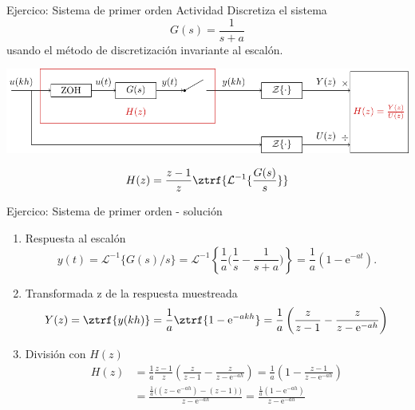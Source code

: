 \documentclass[presentation,aspectratio=169]{beamer}
\begin{document}
\begin{frame}[label={sec:org1d22f78}]{Ejercico: Sistema de primer orden}
\alert{Actividad} Discretiza el sistema 
\[ G(s) = \frac{1}{s + a} \]
usando el método de discretización invariante al escalón.
\begin{center}
\includegraphics[width=0.69\linewidth]{../../figures/invariant-sampling.pdf}
\end{center}

\begin{tcolorbox}
\[ H(z) = \frac{z-1}{z} \ztrf{\mathcal{L}^{-1}\{ \frac{G(s)}{s} \}} \]
\end{tcolorbox}
\end{frame}

\begin{frame}[label={sec:orgb8043c9}]{Ejercico: Sistema de primer orden - solución}
\begin{enumerate}
\item Respuesta al escalón
\[y(t) = \mathcal{L}^{-1}\{G(s)/s\} = \mathcal{L}^{-1}\left\{\frac{1}{a}\big(\frac{1}{s} - \frac{1}{s+a}\big)\right\} = \frac{1}{a}(1 - \mathrm{e}^{-at}).\]
\item Transformada z de la respuesta muestreada
\[ Y(z) = \ztrf{y(kh)} = \frac{1}{a} \ztrf{1 - \mathrm{e}^{-akh}} = \frac{1}{a} \left( \frac{z}{z-1} - \frac{z}{z-\mathrm{e}^{-ah}} \right)\]
\item División con \(H(z)\)
\begin{align*}
 H(z) &=  \frac{1}{a} \frac{z-1}{z} \left( \frac{z}{z-1} - \frac{z}{z-\mathrm{e}^{-ah}} \right)
     = \frac{1}{a} \left( 1 - \frac{z-1}{z-\mathrm{e}^{-ah}}\right)\\
     &= \frac{\frac{1}{a}\big((z-\mathrm{e}^{-ah}) - (z-1)\big)}{z-\mathrm{e}^{-ah}}
      = \frac{\frac{1}{a}(1-\mathrm{e}^{-ah})}{z-\mathrm{e}^{-ah}}
\end{align*}
\end{enumerate}
\end{frame}
\end{document}
